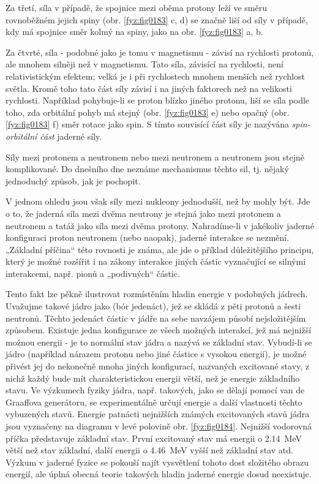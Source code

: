     Za třetí, síla v případě, že spojnice mezi oběma protony leží ve směru rovnoběžném jejich spiny
    (obr. \ref{fyz:fig0183} c, d) se značně liší od síly v případě, kdy má spojnice směr kolmý na
    spiny, jako na obr. \ref{fyz:fig0183} a, b.

    Za čtvrté, síla - podobné jako je tomu v magnetismu - závisí na rychlosti protonů, ale mnohem
    silněji než v magnetismu. Tato síla, závisící na rychlosti, není relativistickým efektem; velká
    je i při rychlostech mnohem menších než rychlost světla. Kromě toho tato část síly závisí i na
    jiných faktorech než na velikosti rychlosti. Například pohybuje-li se proton blízko jiného
    protonu, liší se síla podle toho, zda orbitální pohyb má stejný (obr. \ref{fyz:fig0183} e) nebo
    opačný (obr. \ref{fyz:fig0183} f) směr rotace jako spin. S tímto souvisící část síly je nazývána
    \emph{spin-orbitální část} jaderné síly.

    Síly mezi protonem a neutronem nebo mezi neutronem a neutronem jsou stejně komplikované. Do
    dnešního dne neznáme mechanismus těchto sil, tj. nějaký jednoduchý způsob, jak je pochopit.

    V jednom ohledu jsou však síly mezi nukleony jednodušší, než by mohly být. Jde o to, že jaderná
    síla mezi dvěma neutrony je stejná jako mezi protonem a neutronem a tatáž jako síla mezi dvěma
    protony. Nahradíme-li v jakékoliv jaderné konfiguraci proton neutronem (nebo naopak), jaderné
    interakce se nezmění. „Základní příčina“ této rovnosti je známa, ale jde o příklad důležitějšího
    principu, který je možné rozšířit i na zákony interakce jiných částic vyznačující se silnými
    interakcemi, např. pionů a „podivných“ částic.

    Tento fakt lze pěkně ilustrovat rozmístěním hladin energie v podobných jádrech. Uvažujme takové
    jádro jako  (bór jedenáct), jež se skládá z pěti protonů a šesti neutronů. Těchto
    jedenáct částic v jádře na sebe navzájem působí nejsložitějším způsobem. Existuje jedna
    konfigurace ze všech možných interakcí, jež má nejnižší možnou energii - je to normální stav
    jádra a nazývá se základní stav. Vybudí-li se jádro (například nárazem protonu nebo jiné částice
    s vysokou energií), je možné přivést jej do nekonečně mnoha jiných konfigurací, nazvaných
    excitované stavy, z nichž každý bude mít charakteristickou energii větší, než je energie
    základního stavu. Ve výzkumech fyziky jádra, např. takových, jako se dělají pomocí van de
    Graaffova generátoru, se experimentálně určují energie a další vlastnosti těchto vybuzených
    stavů. Energie patnácti nejnižších známých excitovaných stavů jádra  jsou vyznačeny na
    diagramu v levé polovině obr. \ref{fyz:fig0184}. Nejnižší vodorovná příčka představuje základní
    stav. První excitovaný stav má energii o \SI{2.14}{\mega\electronvolt} větší než stav základní,
    další energii o \SI{4.46}{\mega\electronvolt} vyšší než základní stav atd. Výzkum v jaderné
    fyzice se pokouší najít vysvětlení tohoto dost složitého obrazu energií, ale úplná obecná teorie
    takových hladin jaderné energie dosud neexistuje.
    

